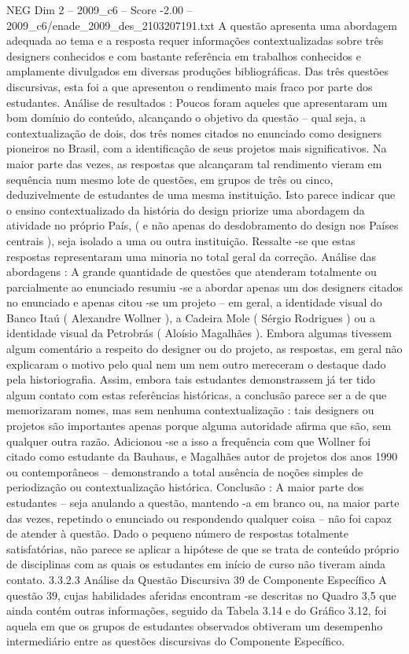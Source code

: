 \begin{textsample}{NEG Dim 2 – 2009\_c6 – Score -2.00 – 2009\_c6/enade\_2009\_des\_2103207191.txt}
A questão apresenta uma abordagem adequada ao tema e a resposta requer informações contextualizadas sobre três designers conhecidos e com bastante referência em trabalhos conhecidos e amplamente divulgados em diversas produções bibliográficas.
Das três questões discursivas, esta foi a que apresentou o rendimento mais fraco por parte dos estudantes.
Análise de resultados : Poucos foram aqueles que apresentaram um bom domínio do conteúdo, alcançando o objetivo da questão – qual seja, a contextualização de dois, dos três nomes citados no enunciado como designers pioneiros no Brasil, com a identificação de seus projetos mais significativos.
Na maior parte das vezes, as respostas que alcançaram tal rendimento vieram em sequência num mesmo lote de questões, em grupos de três ou cinco, deduzivelmente de estudantes de uma mesma instituição.
Isto parece indicar que o ensino contextualizado da história do design priorize uma abordagem da atividade no próprio País, ( e não apenas do desdobramento do design nos Países centrais ), seja isolado a uma ou outra instituição.
Ressalte -se que estas respostas representaram uma minoria no total geral da correção.
Análise das abordagens : A grande quantidade de questões que atenderam totalmente ou parcialmente ao enunciado resumiu -se a abordar apenas um dos designers citados no enunciado e apenas citou -se um projeto – em geral, a identidade visual do Banco Itaú ( Alexandre Wollner ), a Cadeira Mole ( Sérgio Rodrigues ) ou a identidade visual da Petrobrás ( Aloísio Magalhães ).
Embora algumas tivessem algum comentário a respeito do designer ou do projeto, as respostas, em geral não explicaram o motivo pelo qual nem um nem outro mereceram o destaque dado pela historiografia.
Assim, embora tais estudantes demonstrassem já ter tido algum contato com estas referências históricas, a conclusão parece ser a de que memorizaram nomes, mas sem nenhuma contextualização : tais designers ou projetos são importantes apenas porque alguma autoridade afirma que são, sem qualquer outra razão.
Adicionou -se a isso a frequência com que Wollner foi citado como estudante da Bauhaus, e Magalhães autor de projetos dos anos 1990 ou contemporâneos – demonstrando a total ausência de noções simples de periodização ou contextualização histórica.
Conclusão : A maior parte dos estudantes – seja anulando a questão, mantendo -a em branco ou, na maior parte das vezes, repetindo o enunciado ou respondendo qualquer coisa – não foi capaz de atender à questão.
Dado o pequeno número de respostas totalmente satisfatórias, não parece se aplicar a hipótese de que se trata de conteúdo próprio de disciplinas com as quais os estudantes em início de curso não tiveram ainda contato. 3.3.2.3 Análise da Questão Discursiva 39 de Componente Específico A questão 39, cujas habilidades aferidas encontram -se descritas no Quadro 3,5 que ainda contém outras informações, seguido da Tabela 3.14 e do Gráfico 3.12, foi aquela em que os grupos de estudantes observados obtiveram um desempenho intermediário entre as questões discursivas do Componente Específico.

\end{textsample}
